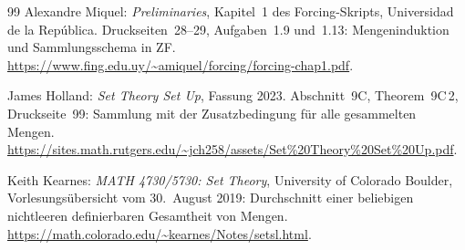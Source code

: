 \begin{thebibliography}{99}
Alexandre Miquel: \emph{Preliminaries}, Kapitel~1 des
Forcing-Skripts, Universidad de la República.
Druckseiten~28--29, Aufgaben~1.9 und~1.13:
Mengeninduktion und Sammlungsschema in ZF.
\url{https://www.fing.edu.uy/~amiquel/forcing/forcing-chap1.pdf}.

James Holland: \emph{Set Theory Set Up}, Fassung 2023.
Abschnitt~9C, Theorem~9C\,2, Druckseite~99:
Sammlung mit der Zusatzbedingung für alle gesammelten Mengen.
\url{https://sites.math.rutgers.edu/~jch258/assets/Set%20Theory%20Set%20Up.pdf}.

Keith Kearnes: \emph{MATH 4730/5730: Set Theory},
University of Colorado Boulder, Vorlesungsübersicht vom
30.~August 2019: Durchschnitt einer beliebigen nichtleeren
definierbaren Gesamtheit von Mengen.
\url{https://math.colorado.edu/~kearnes/Notes/setsl.html}.

\end{thebibliography}
